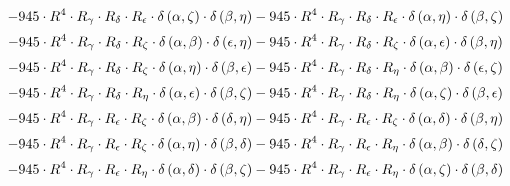 \begin{subequations}
\begin{gather}
 \\[0.2em] \notag 		 - 945 \cdot R^{4} \cdot R_{\gamma{}} \cdot R_{\delta{}} \cdot R_{\epsilon{}} \cdot \delta{}\left(\alpha{}, \zeta{}\right) \cdot \delta{}\left(\beta{}, \eta{}\right)- 945 \cdot R^{4} \cdot R_{\gamma{}} \cdot R_{\delta{}} \cdot R_{\epsilon{}} \cdot \delta{}\left(\alpha{}, \eta{}\right) \cdot \delta{}\left(\beta{}, \zeta{}\right) 
 \\[0.2em] \notag 		 - 945 \cdot R^{4} \cdot R_{\gamma{}} \cdot R_{\delta{}} \cdot R_{\zeta{}} \cdot \delta{}\left(\alpha{}, \beta{}\right) \cdot \delta{}\left(\epsilon{}, \eta{}\right)- 945 \cdot R^{4} \cdot R_{\gamma{}} \cdot R_{\delta{}} \cdot R_{\zeta{}} \cdot \delta{}\left(\alpha{}, \epsilon{}\right) \cdot \delta{}\left(\beta{}, \eta{}\right) 
 \\[0.2em] \notag 		 - 945 \cdot R^{4} \cdot R_{\gamma{}} \cdot R_{\delta{}} \cdot R_{\zeta{}} \cdot \delta{}\left(\alpha{}, \eta{}\right) \cdot \delta{}\left(\beta{}, \epsilon{}\right)- 945 \cdot R^{4} \cdot R_{\gamma{}} \cdot R_{\delta{}} \cdot R_{\eta{}} \cdot \delta{}\left(\alpha{}, \beta{}\right) \cdot \delta{}\left(\epsilon{}, \zeta{}\right) 
 \\[0.2em] \notag 		 - 945 \cdot R^{4} \cdot R_{\gamma{}} \cdot R_{\delta{}} \cdot R_{\eta{}} \cdot \delta{}\left(\alpha{}, \epsilon{}\right) \cdot \delta{}\left(\beta{}, \zeta{}\right)- 945 \cdot R^{4} \cdot R_{\gamma{}} \cdot R_{\delta{}} \cdot R_{\eta{}} \cdot \delta{}\left(\alpha{}, \zeta{}\right) \cdot \delta{}\left(\beta{}, \epsilon{}\right) 
 \\[0.2em] \notag 		 - 945 \cdot R^{4} \cdot R_{\gamma{}} \cdot R_{\epsilon{}} \cdot R_{\zeta{}} \cdot \delta{}\left(\alpha{}, \beta{}\right) \cdot \delta{}\left(\delta{}, \eta{}\right)- 945 \cdot R^{4} \cdot R_{\gamma{}} \cdot R_{\epsilon{}} \cdot R_{\zeta{}} \cdot \delta{}\left(\alpha{}, \delta{}\right) \cdot \delta{}\left(\beta{}, \eta{}\right) 
 \\[0.2em] \notag 		 - 945 \cdot R^{4} \cdot R_{\gamma{}} \cdot R_{\epsilon{}} \cdot R_{\zeta{}} \cdot \delta{}\left(\alpha{}, \eta{}\right) \cdot \delta{}\left(\beta{}, \delta{}\right)- 945 \cdot R^{4} \cdot R_{\gamma{}} \cdot R_{\epsilon{}} \cdot R_{\eta{}} \cdot \delta{}\left(\alpha{}, \beta{}\right) \cdot \delta{}\left(\delta{}, \zeta{}\right) 
 \\[0.2em] \notag 		 - 945 \cdot R^{4} \cdot R_{\gamma{}} \cdot R_{\epsilon{}} \cdot R_{\eta{}} \cdot \delta{}\left(\alpha{}, \delta{}\right) \cdot \delta{}\left(\beta{}, \zeta{}\right)- 945 \cdot R^{4} \cdot R_{\gamma{}} \cdot R_{\epsilon{}} \cdot R_{\eta{}} \cdot \delta{}\left(\alpha{}, \zeta{}\right) \cdot \delta{}\left(\beta{}, \delta{}\right) 

\end{gather}
\end{subequations}
